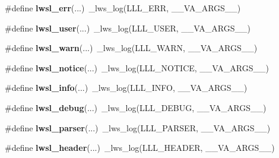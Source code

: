 \begin{DoxyCompactItemize}
\item 
\mbox{\label{group__log_gad44c15d00076052a398244035a7dbb56}} 
\#define {\bfseries lwsl\+\_\+err}(...)~\+\_\+lws\+\_\+log(L\+L\+L\+\_\+\+E\+RR, \+\_\+\+\_\+\+V\+A\+\_\+\+A\+R\+G\+S\+\_\+\+\_\+)
\item 
\mbox{\label{group__log_ga9aad07786eb4b3189b0eac919b2a960f}} 
\#define {\bfseries lwsl\+\_\+user}(...)~\+\_\+lws\+\_\+log(L\+L\+L\+\_\+\+U\+S\+ER, \+\_\+\+\_\+\+V\+A\+\_\+\+A\+R\+G\+S\+\_\+\+\_\+)
\item 
\mbox{\label{group__log_ga1bcd293826c0a91d6e7ac3c54db72885}} 
\#define {\bfseries lwsl\+\_\+warn}(...)~\+\_\+lws\+\_\+log(L\+L\+L\+\_\+\+W\+A\+RN, \+\_\+\+\_\+\+V\+A\+\_\+\+A\+R\+G\+S\+\_\+\+\_\+)
\item 
\mbox{\label{group__log_ga86b3c56c638569eb93919c52a1d5dfaf}} 
\#define {\bfseries lwsl\+\_\+notice}(...)~\+\_\+lws\+\_\+log(L\+L\+L\+\_\+\+N\+O\+T\+I\+CE, \+\_\+\+\_\+\+V\+A\+\_\+\+A\+R\+G\+S\+\_\+\+\_\+)
\item 
\mbox{\label{group__log_gaf13957a4d9fb47c070b9320303c32502}} 
\#define {\bfseries lwsl\+\_\+info}(...)~\+\_\+lws\+\_\+log(L\+L\+L\+\_\+\+I\+N\+FO, \+\_\+\+\_\+\+V\+A\+\_\+\+A\+R\+G\+S\+\_\+\+\_\+)
\item 
\mbox{\label{group__log_ga74a1a3d4d96b146a0ac45faab0028ade}} 
\#define {\bfseries lwsl\+\_\+debug}(...)~\+\_\+lws\+\_\+log(L\+L\+L\+\_\+\+D\+E\+B\+UG, \+\_\+\+\_\+\+V\+A\+\_\+\+A\+R\+G\+S\+\_\+\+\_\+)
\item 
\mbox{\label{group__log_gaee051a14945bec746ed3b527f384dc72}} 
\#define {\bfseries lwsl\+\_\+parser}(...)~\+\_\+lws\+\_\+log(L\+L\+L\+\_\+\+P\+A\+R\+S\+ER, \+\_\+\+\_\+\+V\+A\+\_\+\+A\+R\+G\+S\+\_\+\+\_\+)
\item 
\mbox{\label{group__log_gaab72aa186eff075fb3d229cb99a35434}} 
\#define {\bfseries lwsl\+\_\+header}(...)~\+\_\+lws\+\_\+log(L\+L\+L\+\_\+\+H\+E\+A\+D\+ER, \+\_\+\+\_\+\+V\+A\+\_\+\+A\+R\+G\+S\+\_\+\+\_\+)
\item 
\mbox{\label{group__log_ga8e0877b452d80bc154793ad81bfce742}} 

\end{DoxyCompactItemize}
